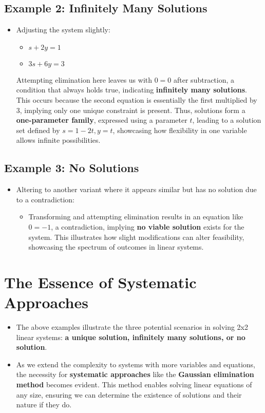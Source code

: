 \documentclass{article}
\begin{document}
\subsection{Example 2: Infinitely Many Solutions}

\begin{itemize}
    \item Adjusting the system slightly:
    \begin{itemize}
        \item \(s + 2y = 1\)
        \item \(3s + 6y = 3\)
    \end{itemize}
    Attempting elimination here leaves us with \(0 = 0\) after subtraction, a condition that always holds true, indicating \textbf{infinitely many solutions}. This occurs because the second equation is essentially the first multiplied by 3, implying only one unique constraint is present. Thus, solutions form a \textbf{one-parameter family}, expressed using a parameter \(t\), leading to a solution set defined by \(s = 1 - 2t, y = t\), showcasing how flexibility in one variable allows infinite possibilities.
\end{itemize}

\subsection{Example 3: No Solutions}

\begin{itemize}
    \item Altering to another variant where it appears similar but has no solution due to a contradiction:
    \begin{itemize}
        \item Transforming and attempting elimination results in an equation like \(0 = -1\), a contradiction, implying \textbf{no viable solution} exists for the system. This illustrates how slight modifications can alter feasibility, showcasing the spectrum of outcomes in linear systems.
    \end{itemize}
\end{itemize}

\section{The Essence of Systematic Approaches}

\begin{itemize}
    \item The above examples illustrate the three potential scenarios in solving 2x2 linear systems: \textbf{a unique solution, infinitely many solutions, or no solution}. 
    \item As we extend the complexity to systems with more variables and equations, the necessity for \textbf{systematic approaches} like the \textbf{Gaussian elimination method} becomes evident. This method enables solving linear equations of any size, ensuring we can determine the existence of solutions and their nature if they do.
\end{itemize}
\end{document}
